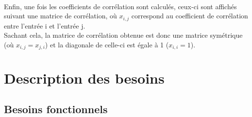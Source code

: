 \documentclass{article}
\begin{document}
    \paragraph{}
    Enfin, une fois les coefficients de corrélation sont calculés, ceux-ci sont
    affichés suivant une matrice de corrélation, où $x_{i,j}$ correspond au
    coefficient de corrélation entre l'entrée i et l'entrée j.\\
    Sachant cela, la matrice de corrélation obtenue est donc une matrice
    symétrique (où $x_{i,j} = x_{j,i}$) et la diagonale de celle-ci est égale à
    1 ($x_{i,i} = 1$).
  \section{Description des besoins}
    \subsection{Besoins fonctionnels}
\end{document}
